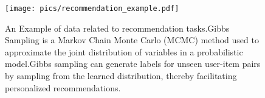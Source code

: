 \begin{figure}
    \centering
    \texttt{[image: pics/recommendation\_example.pdf]}
    \vspace{-7pt}
    \caption{An Example of data related to recommendation tasks.Gibbs Sampling is a Markov Chain Monte Carlo (MCMC) method used to approximate the joint distribution of variables in a probabilistic model.Gibbs sampling can generate labels for unseen user-item pairs by sampling from the learned distribution, thereby facilitating personalized recommendations.
    }
    \label{fig:recommendation_example}
    \vspace{-10pt}
\end{figure}